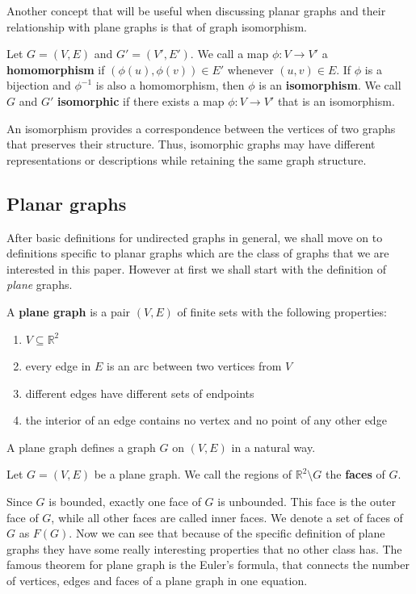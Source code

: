 Another concept that will be useful when discussing planar graphs and their relationship
with plane graphs is that of graph isomorphism.

\begin{defn}
\label{defn:isomorphism}
Let $G = (V, E)$ and $G' = (V', E')$. We call a map $\phi \colon V \rightarrow V'$ a \textbf{homomorphism} if $(\phi(u), \phi(v)) \in E'$ whenever $(u, v) \in E$. If $\phi$ is a bijection and $\phi^{-1}$ is also a homomorphism, then $\phi$ is an \textbf{isomorphism}. We call $G$ and $G'$ \textbf{isomorphic} if there exists a map $\phi \colon V \rightarrow V'$ that is an isomorphism.
\end{defn}

An isomorphism provides a correspondence between the vertices of two graphs that
preserves their structure. Thus, isomorphic graphs may have different representations
or descriptions while retaining the same graph structure.

\subsection{Planar graphs}
After basic definitions for undirected graphs in general, we shall move on to definitions specific to planar graphs which are
the class of graphs that we are interested in this paper. However at first we shall start with the definition of \textit{plane}
graphs.
\\
\begin{defn}
\label{defn:plane-graph}
A \textbf{plane graph} is a pair $(V, E)$ of finite sets with the following properties:
    \begin{enumerate}
        \item $V \subseteq \mathbb{R}^2$
        \item every edge in $E$ is an arc between two vertices from $V$
        \item different edges have different sets of endpoints
        \item the interior of an edge contains no vertex and no point of any other edge
    \end{enumerate}
\end{defn}
\noindent
A plane graph defines a graph $G$ on $(V, E)$ in a natural way.
\begin{defn}
    Let $G = (V, E)$ be a plane graph. We call the regions of $\mathbb{R}^2 \setminus G$ the \textbf{faces} of $G$.
\end{defn}
Since $G$ is bounded, exactly one face of $G$ is unbounded. This face is the outer face of $G$, while all other faces
are called inner faces. We denote a set of faces of $G$ as $F(G)$. Now we can see that because of the specific definition 
of plane graphs they have some really interesting properties that no other class has. The famous theorem for plane graph is the
Euler's formula, that connects the number of vertices, edges and faces of a plane graph in one equation.

